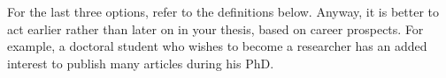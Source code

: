 For the last three options, refer to the definitions below.
Anyway, it is better to act earlier rather than later on in your thesis, based on career prospects.
For example, a doctoral student who wishes to become a researcher has an added interest to publish many articles during his PhD.
%
%

